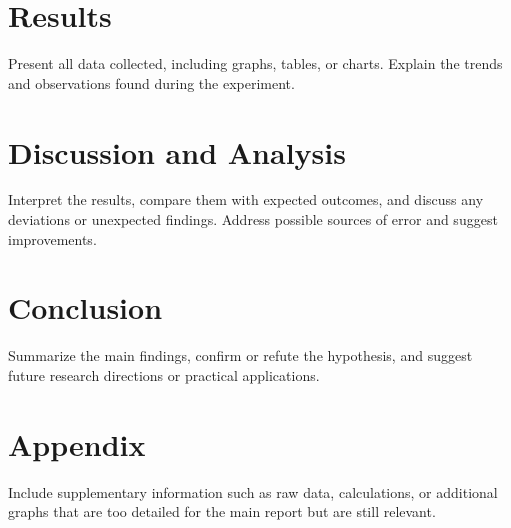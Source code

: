 \documentclass[a4paper,12pt]{article}
\begin{document}
\section{Results}
Present all data collected, including graphs, tables, or charts. Explain the trends and observations found during the experiment.

\section{Discussion and Analysis}
Interpret the results, compare them with expected outcomes, and discuss any deviations or unexpected findings. Address possible sources of error and suggest improvements.

\section{Conclusion}
Summarize the main findings, confirm or refute the hypothesis, and suggest future research directions or practical applications.

\section{Appendix}
Include supplementary information such as raw data, calculations, or additional graphs that are too detailed for the main report but are still relevant.

\printbibliography
\end{document}
